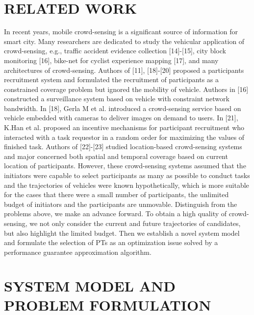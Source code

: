 \documentclass[journal]{IEEEtran}
\begin{document}
\section{RELATED WORK}
In recent years, mobile crowd-sensing is a significant source of information for smart city. Many researchers are dedicated to study the vehicular application of crowd-sensing, e.g., traffic accident evidence collection [14]-[15], city block monitoring [16], bike-net for cyclist experience mapping [17], and many architectures of crowd-sensing. Authors of [11], [18]-[20] proposed a participants recruitment system and formulated the recruitment of participants as a constrained coverage problem but ignored the mobility of vehicle. Authors in [16] constructed a surveillance system based on vehicle with constraint network bandwidth. In [18], Gerla M et al. introduced a crowd-sensing service based on vehicle embedded with cameras to deliver images on demand to users. In [21], K.Han et al. proposed an incentive mechanisms for participant recruitment who interacted with a task requestor in a random order for maximizing the values of finished task. Authors of [22]-[23] studied location-based crowd-sensing systems and major concerned both spatial and temporal coverage based on current location of participants. However,  these crowd-sensing systems assumed that the initiators were capable to select participants as many as possible to conduct tasks and the trajectories of vehicles were known hypothetically, which is more suitable for the cases that there were a small number of participants,  the unlimited budget of initiators and the participants are unmovable. Distinguish from the problems above, we make an advance forward. To obtain a high quality of crowd-sensing, we not only consider the current and future trajectories of candidates, but also highlight the limited budget. Then we establish a novel system model and formulate the selection of PTs as an optimization issue solved by a performance guarantee approximation algorithm.
\section{SYSTEM MODEL AND PROBLEM FORMULATION}
\end{document}
